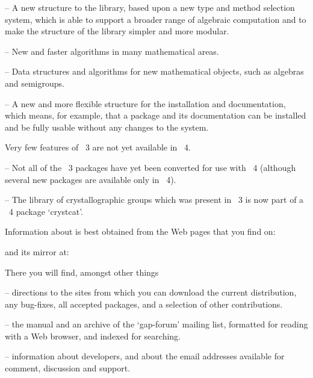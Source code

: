  \item{--} A new structure   to the library, based  upon  a new  type and
  method  selection system, which  is able to  support a broader range of
  algebraic computation and to make the  structure of the library simpler
  and more modular.

  \item{--}
    New and faster algorithms in many mathematical areas.

  \item{--} 
    Data structures and algorithms for new mathematical objects, such as
    algebras and semigroups.

  \item{--}
    A new and more flexible structure  for the {\GAP} installation
    and documentation, which  means, for example, that a {\GAP} package and
    its documentation can be installed and be fully usable without any changes
    to the {\GAP} system.
\endlist

Very few features of {\GAP}~3 are not yet available in  {\GAP}~4.

\beginlist%
   \item{--}
     Not all of the {\GAP}~3 packages have yet been converted
     for use with  {\GAP}~4 (although several new packages are available
     only in  {\GAP}~4). 

   \item{--} The library of crystallographic groups which was present in
     {\GAP}~3 is now part of a {\GAP}~4 package `crystcat'.

\endlist



Information about {\GAP} is best obtained from the {\GAP} Web pages that
you find on:


and its mirror at:


There you will find, amongst other things
\beginlist%
\item{--} directions to the sites from which you can download the
current {\GAP} distribution, any bug-fixes, all accepted {\GAP} packages,
and a selection of other contributions.
\item{--} the {\GAP} manual and an archive of the `gap-forum' mailing
list, formatted for reading with a Web browser, and indexed for
searching.
\item{--} information about {\GAP} developers, and about the email
addresses available for comment, discussion and support.
\endlist

